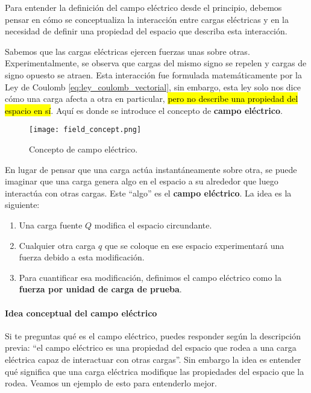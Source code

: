 Para entender la definición del campo eléctrico desde el principio, debemos pensar en cómo se conceptualiza la interacción entre cargas eléctricas y en la necesidad de definir una propiedad del espacio que describa esta interacción.

Sabemos que las cargas eléctricas ejercen fuerzas unas sobre otras. Experimentalmente, se observa que cargas del mismo signo se repelen y cargas de signo opuesto se atraen. Esta interacción fue formulada matemáticamente por la Ley de Coulomb \eqref{eq:ley_coulomb_vectorial}, sin embargo, esta ley solo nos dice cómo una carga afecta a otra en particular, \hl{pero no describe una propiedad del espacio en sí}. Aquí es donde se introduce el concepto de \textbf{campo eléctrico}.

\begin{figure}[ht]
    \centering
    \texttt{[image: field\_concept.png]}
    \caption{Concepto de campo eléctrico.}
    \label{fig:concepto_campo_electrico}
\end{figure}

En lugar de pensar que una carga actúa instantáneamente sobre otra, se puede imaginar que una carga genera algo en el espacio a su alrededor que luego interactúa con otras cargas. Este ``algo'' es el \textbf{campo eléctrico}. La idea es la siguiente:

\begin{enumerate}
    \item Una carga fuente \( Q \) modifica el espacio circundante.
    \item Cualquier otra carga \( q \) que se coloque en ese espacio experimentará una fuerza debido a esta modificación.
    \item Para cuantificar esa modificación, definimos el campo eléctrico como la \textbf{fuerza por unidad de carga de prueba}.
\end{enumerate}

\paragraph{Idea conceptual del campo eléctrico}

Si te preguntas qué es el campo eléctrico, puedes responder según la descripción previa: ``el campo eléctrico es una propiedad del espacio que rodea a una carga eléctrica capaz de interactuar con otras cargas''. Sin embargo la idea es entender qué significa que una carga eléctrica modifique las propiedades del espacio que la rodea. Veamos un ejemplo de esto para entenderlo mejor.

